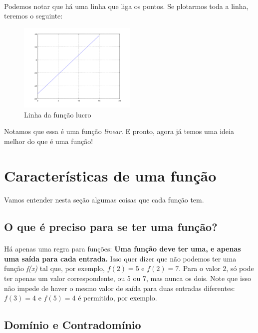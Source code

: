 \documentclass[11pt]{article}
\begin{document}
\paragraph{}
Podemos notar que há uma linha que liga os pontos. Se plotarmos toda a linha,
teremos o seguinte:
\begin{figure}[H]
  		\centering
    	\includegraphics[width=0.5\textwidth]{imgs/linha.png}
		\caption[9pt]{Linha da função lucro}
\end{figure}
Notamos que essa é uma função \emph{linear}. E pronto, agora já temos uma
ideia melhor do que é uma função!

\section{Características de uma função}
\paragraph{}
Vamos entender nesta seção algumas coisas que cada função tem.

\subsection{O que é preciso para se ter uma função?}
\paragraph{}
Há apenas uma regra para funções: \textbf{Uma função deve ter uma, e apenas 
uma saída para cada entrada.} Isso quer dizer que não podemos ter uma função
\textit{f(x)} tal que, por exemplo, $f(2) = 5$ e $f(2) = 7$. Para o valor 
$2$, só pode ter apenas um valor correspondente, ou 5 ou 7, mas nunca os 
dois. Note que isso não impede de haver o mesmo valor de saída para duas
entradas diferentes: $f(3) = 4$ e $f(5) = 4$ é permitido, por exemplo.

\subsection{Domínio e Contradomínio}
\end{document}
